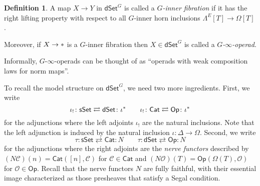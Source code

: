 \documentclass[a4paper,10pt
,draft
]{article}%
\numberwithin{equation}{section}
\numberwithin{figure}{section}
\theoremstyle{definition} %
\newtheorem{definition}[equation]{Definition}%
\newtheorem{example}[equation]{Example}%
\newcommand{\dSet}{\mathsf{dSet}}
\DeclareMathOperator{\Hom}{Hom}%
\newcommand{\1}{\ensuremath{\mathbbm 1}}%
\begin{document}
\begin{definition}
	A map $X \to Y$ in $\dSet^G$
	is called a \emph{$G$-inner fibration}
	if it has the right lifting property
	with respect to all $G$-inner horn inclusions
	$\Lambda^E[T] \to \Omega[T]$.
	
	Moreover, 
	if $X \to \**$
	is a $G$-inner fibration
	then 
	$X \in \dSet^G$ is called a \textit{$G$-$\infty$-operad}.
\end{definition}


Informally,
$G$-$\infty$-operads can be thought of as
``operads with weak composition laws for norm maps''.





To recall the model structure on $\mathsf{dSet}^G$,
we need two more ingredients.
First, we write
\begin{equation}\label{IOTASHADJ EQ}
	\iota_! \colon 
	\mathsf{sSet}
	\rightleftarrows
	\mathsf{dSet}
	\colon
	\iota^{\**}
\qquad
	\iota_! \colon 
	\mathsf{Cat}
	\rightleftarrows
	\mathsf{Op}
	\colon
	\iota^{\**}
\end{equation}
for the adjunctions
where the left adjoints $\iota_!$
are the natural inclusions.
Note that the left adjunction is induced by the natural inclusion
$\iota \colon \Delta \to \Omega$.
Second, we write
\begin{equation}\label{TAUADJ EQ}
	\tau \colon 
	\mathsf{sSet}
	\rightleftarrows
	\mathsf{Cat}
	\colon
	N
\qquad
	\tau \colon 
	\mathsf{dSet}
	\rightleftarrows
	\mathsf{Op}
	\colon
	N
\end{equation}
for the adjunctions where the right adjoints are the 
\emph{nerve functors}
described by
$(N \mathcal{C})(n) = 
\mathsf{Cat}\left([n],\mathcal{C}\right)$
for $\mathcal{C}\in \mathsf{Cat}$
and
$(N \mathcal{O})(T) = 
\mathsf{Op}\left(\Omega(T),\mathcal{O}\right)$
for $\mathcal{O}\in \mathsf{Op}$.
Recall \cite[Prop. 5.3 and Thm. 6.1]{MW09}
that the nerve functors $N$ are fully faithful, 
with their essential image characterized
as those presheaves 
that satisfy a Segal condition.
\end{document}
